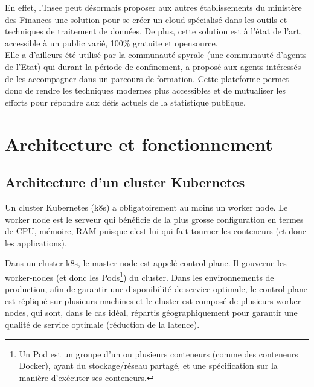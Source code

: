 \documentclass[11pt,fleqn]{book} %
\begin{document}
En effet, l'Insee peut désormais proposer aux autres établissements du ministère des Finances une solution pour se créer un cloud spécialisé dans les outils et techniques de traitement de données. De plus, cette solution est à l’état de l’art, accessible à un public varié, 100\% gratuite et opensource.\\

Elle a d'ailleurs été utilisé par la communauté spyrale (une communauté d'agents de l'Etat) qui durant la période de confinement, a proposé aux agents intéressés de les accompagner dans un parcours de formation. Cette plateforme permet donc de rendre les techniques modernes plus accessibles et de mutualiser les efforts pour répondre aux défis actuels de la statistique publique.\\



\appendix


\chapter{Architecture et fonctionnement}
\vspace{-2cm}
\label{Architecture}

\section*{Architecture d'un cluster Kubernetes}
Un cluster Kubernetes (k8s) a obligatoirement au moins un worker node. Le worker node est le serveur qui bénéficie de la plus grosse configuration en termes de CPU, mémoire, RAM puisque c'est lui qui fait tourner les conteneurs (et donc les applications).\newline 

Dans un cluster k8s, le  master node est appelé control plane. Il gouverne les worker-nodes (et donc les Pods\footnote{Un Pod est un groupe d'un ou plusieurs conteneurs (comme des conteneurs Docker), ayant du stockage/réseau partagé, et une spécification sur la manière d'exécuter ses conteneurs.}) du cluster. Dans les environnements de production, afin de garantir une disponibilité de service optimale, le control plane est répliqué sur plusieurs machines et le cluster est composé de plusieurs worker nodes, qui sont, dans le cas idéal, répartis géographiquement pour garantir une qualité de service optimale (réduction de la latence).\newline
\end{document}
